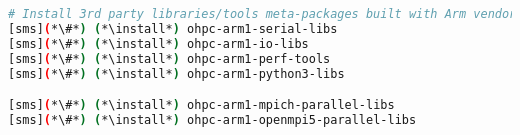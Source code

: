 \begin{lstlisting}[language=bash,keywords={},upquote=true,keepspaces]
# Install 3rd party libraries/tools meta-packages built with Arm vendor toolchain
[sms](*\#*) (*\install*) ohpc-arm1-serial-libs
[sms](*\#*) (*\install*) ohpc-arm1-io-libs
[sms](*\#*) (*\install*) ohpc-arm1-perf-tools
[sms](*\#*) (*\install*) ohpc-arm1-python3-libs

[sms](*\#*) (*\install*) ohpc-arm1-mpich-parallel-libs
[sms](*\#*) (*\install*) ohpc-arm1-openmpi5-parallel-libs
\end{lstlisting}


